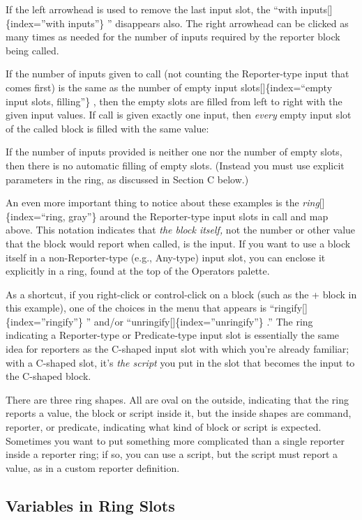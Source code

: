 \documentclass[
  letterpaper,
]{book}
\begin{document}
If the left arrowhead is used to remove the last input slot, the ``with
inputs{[}{]}\{index=''with inputs''\} '' disappears also. The right
arrowhead can be clicked as many times as needed for the number of
inputs required by the reporter block being called.

If the number of inputs given to call (not counting the Reporter-type
input that comes first) is the same as the number of empty input
slots{[}{]}\{index=``empty input slots, filling''\} , then the empty
slots are filled from left to right with the given input values. If call
is given exactly one input, then \emph{every} empty input slot of the
called block is filled with the same value:

If the number of inputs provided is neither one nor the number of empty
slots, then there is no automatic filling of empty slots. (Instead you
must use explicit parameters in the ring, as discussed in Section C
below.)

An even more important thing to notice about these examples is the
\emph{ring}{[}{]}\{index=``ring, gray''\} around the Reporter-type input
slots in call and map above. This notation indicates that \emph{the
block itself,} not the number or other value that the block would report
when called, is the input. If you want to use a block itself in a
non-Reporter-type (e.g., Any-type) input slot, you can enclose it
explicitly in a ring, found at the top of the Operators palette.

As a shortcut, if you right-click or control-click on a block (such as
the + block in this example), one of the choices in the menu that
appears is ``ringify{[}{]}\{index=''ringify''\} '' and/or
``unringify{[}{]}\{index=''unringify''\} .'' The ring indicating a
Reporter-type or Predicate-type input slot is essentially the same idea
for reporters as the C-shaped input slot with which you're already
familiar; with a C-shaped slot, it's \emph{the script} you put in the
slot that becomes the input to the C-shaped block.

There are three ring shapes. All are oval on the outside, indicating
that the ring reports a value, the block or script inside it, but the
inside shapes are command, reporter, or predicate, indicating what kind
of block or script is expected. Sometimes you want to put something more
complicated than a single reporter inside a reporter ring; if so, you
can use a script, but the script must report a value, as in a custom
reporter definition.

\subsection{Variables in Ring Slots}\label{variables-in-ring-slots}
\end{document}

